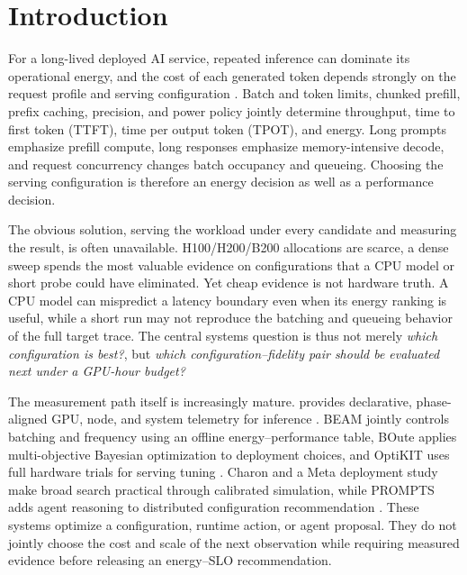 \section{Introduction}

For a long-lived deployed AI service, repeated inference can dominate its
operational energy, and the cost of each generated token depends strongly on
the request profile and serving configuration
\cite{samsi2023words,niu2025engines,fernandez2025energy}.  Batch and token
limits, chunked prefill, prefix caching, precision, and power policy
jointly determine throughput, time to first token (TTFT), time per output token
(TPOT), and energy.  Long prompts emphasize prefill compute, long responses
emphasize memory-intensive decode, and request concurrency changes batch
occupancy and queueing.  Choosing the serving configuration is therefore an
energy decision as well as a performance decision.

The obvious solution, serving the workload under every candidate and measuring
the result, is often unavailable.  H100/H200/B200 allocations are scarce,
a dense sweep spends the most valuable evidence on configurations that a CPU
model or short probe could have eliminated.  Yet cheap evidence is not hardware
truth.  A CPU model can mispredict a latency boundary even when its energy
ranking is useful, while a short run may not reproduce the batching and
queueing behavior of the full target trace.  The central systems question is
thus not merely
\emph{which configuration is best?}, but \emph{which
configuration--fidelity pair should be evaluated next under a GPU-hour budget?}

The measurement path itself is increasingly mature.  \bench{} provides
declarative, phase-aligned GPU, node, and system telemetry for inference
\cite{niu2026tokenpowerbench}.  BEAM jointly controls
batching and frequency using an offline energy--performance table, BOute applies
multi-objective Bayesian optimization to deployment choices, and OptiKIT uses
full hardware trials for serving tuning
\cite{lee2026beam,jiang2026boute,santavas2026optikit}.  Charon and a Meta
deployment study make broad search practical through calibrated simulation,
while PROMPTS adds agent reasoning to distributed configuration recommendation
\cite{yang2026charon,cho2026deployment,ding2026prompts}.  These systems optimize
a configuration, runtime action, or agent proposal.  They do not jointly choose
the cost and scale of the next observation while requiring measured evidence
before releasing an energy--SLO recommendation.

